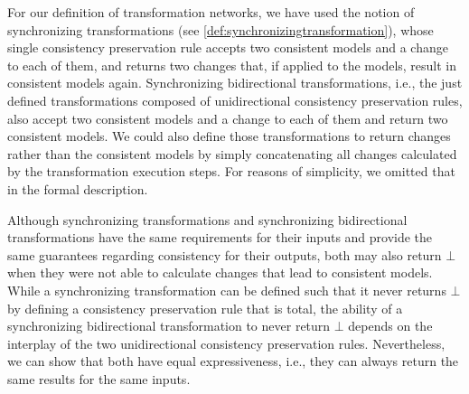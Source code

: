 For our definition of transformation networks, we have used the notion of synchronizing transformations (see \autoref{def:synchronizingtransformation}), whose single consistency preservation rule accepts two consistent models and a change to each of them, and returns two changes that, if applied to the models, result in consistent models again.
Synchronizing bidirectional transformations, i.e., the just defined transformations composed of unidirectional consistency preservation rules, also accept two consistent models and a change to each of them and return two consistent models.
We could also define those transformations to return changes rather than the consistent models by simply concatenating all changes calculated by the transformation execution steps.
For reasons of simplicity, we omitted that in the formal description.

Although synchronizing transformations and synchronizing bidirectional transformations have the same requirements for their inputs and provide the same guarantees regarding consistency for their outputs, both may also return $\bot$ when they were not able to calculate changes that lead to consistent models.
While a synchronizing transformation can be defined such that it never returns $\bot$ by defining a consistency preservation rule that is total, the ability of a synchronizing bidirectional transformation to never return $\bot$ depends on the interplay of the two unidirectional consistency preservation rules.
Nevertheless, we can show that both have equal expressiveness, i.e., they can always return the same results for the same inputs.

